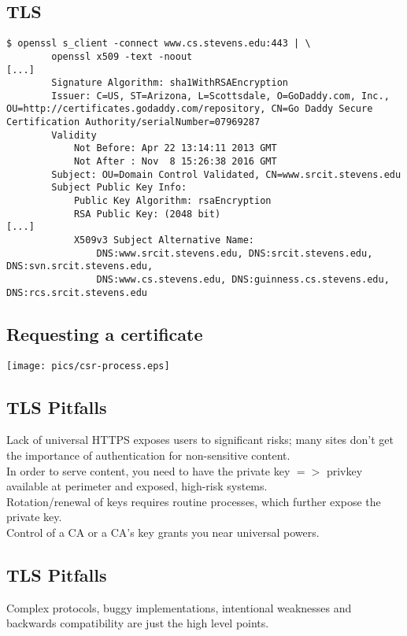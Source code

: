 \documentclass[xga]{xdvislides}
\begin{document}
\subsection{TLS}
\begin{verbatim}
$ openssl s_client -connect www.cs.stevens.edu:443 | \
        openssl x509 -text -noout
[...]
        Signature Algorithm: sha1WithRSAEncryption
        Issuer: C=US, ST=Arizona, L=Scottsdale, O=GoDaddy.com, Inc., OU=http://certificates.godaddy.com/repository, CN=Go Daddy Secure Certification Authority/serialNumber=07969287
        Validity
            Not Before: Apr 22 13:14:11 2013 GMT
            Not After : Nov  8 15:26:38 2016 GMT
        Subject: OU=Domain Control Validated, CN=www.srcit.stevens.edu
        Subject Public Key Info:
            Public Key Algorithm: rsaEncryption
            RSA Public Key: (2048 bit)
[...]
            X509v3 Subject Alternative Name: 
                DNS:www.srcit.stevens.edu, DNS:srcit.stevens.edu, DNS:svn.srcit.stevens.edu,
                DNS:www.cs.stevens.edu, DNS:guinness.cs.stevens.edu, DNS:rcs.srcit.stevens.edu
\end{verbatim}

\subsection{Requesting a certificate}
\begin{center}
	\texttt{[image: pics/csr-process.eps]}
\end{center}

\subsection{TLS Pitfalls}
Lack of universal HTTPS exposes users to significant
risks; many sites don't get the importance of
authentication for non-sensitive content. \\

In order to serve content, you need to have the
private key $ => $ privkey available at perimeter and
exposed, high-risk systems. \\

Rotation/renewal of keys requires routine processes,
which further expose the private key. \\

Control of a CA or a CA's key grants you near
universal powers. \\


\subsection{TLS Pitfalls}
Complex protocols, buggy implementations, intentional
weaknesses and backwards compatibility are just the
high level points.
\end{document}
